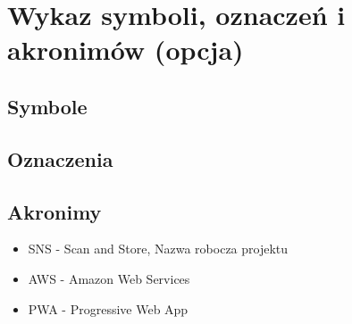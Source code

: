 \documentclass[../main.tex]{subfiles}
\begin{document}
\section{Wykaz symboli, oznaczeń i akronimów (opcja)}
    \subsection{Symbole}
    \subsection{Oznaczenia}
    \subsection{Akronimy}
        \begin{itemize}
            \item SNS - Scan and Store, Nazwa robocza projektu
            \item AWS - Amazon Web Services
            \item PWA - Progressive Web App
        \end{itemize}
\end{document}
